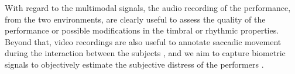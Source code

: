 With regard to the multimodal signals, the audio recording of the performance, from the two environments, are clearly useful to assess the quality of the performance or possible modifications in the timbral or rhythmic properties. Beyond that, video recordings are also useful to annotate saccadic movement during the interaction between the subjects \cite{vandemoortele2018gazing}, and we aim to capture biometric signals to objectively estimate the subjective distress of the performers \cite{Yoshie2009}. 
